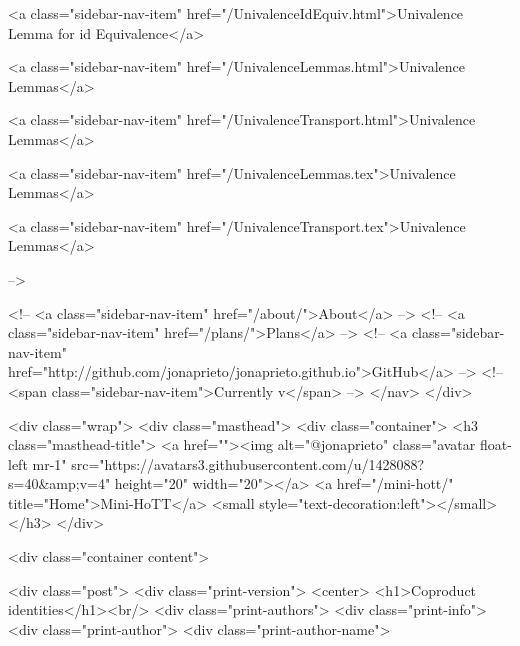       
    
      
        
          <a class="sidebar-nav-item" href="/UnivalenceIdEquiv.html">Univalence Lemma for id Equivalence</a>
        
      
    
      
        
          <a class="sidebar-nav-item" href="/UnivalenceLemmas.html">Univalence Lemmas</a>
        
      
    
      
        
          <a class="sidebar-nav-item" href="/UnivalenceTransport.html">Univalence Lemmas</a>
        
      
    
      
        
          <a class="sidebar-nav-item" href="/UnivalenceLemmas.tex">Univalence Lemmas</a>
        
      
    
      
        
          <a class="sidebar-nav-item" href="/UnivalenceTransport.tex">Univalence Lemmas</a>
        
      
     -->

    <!-- <a class="sidebar-nav-item" href="/about/">About</a> -->
    <!-- <a class="sidebar-nav-item" href="/plans/">Plans</a> -->
    <!-- <a class="sidebar-nav-item" href="http://github.com/jonaprieto/jonaprieto.github.io">GitHub</a> -->
    <!-- <span class="sidebar-nav-item">Currently v</span> -->
  </nav>
</div>

    <div class="wrap">
      <div class="masthead">
        <div class="container">
          <h3 class="masthead-title">
            <a href=""><img alt="@jonaprieto" class="avatar float-left mr-1" src="https://avatars3.githubusercontent.com/u/1428088?s=40&amp;v=4" height="20" width="20"></a>
            <a href="/mini-hott/" title="Home">Mini-HoTT</a>
            <small style="text-decoration:left"></small>
          </h3>
        </div>
      
      <div class="container content">
        







<div class="post">
  <div class="print-version">
    <center>
      <h1>Coproduct identities</h1><br/>
        <div class="print-authors">
          <div class="print-info">
            <div class="print-author">
              <div class="print-author-name">
                
